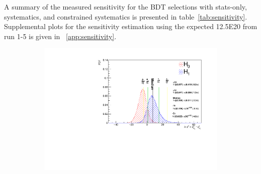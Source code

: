 A summary of the measured sensitivity for the BDT selections with stats-only, systematics, and constrained systematics is presented in table~\ref{tab:sensitivity}. Supplemental plots for the sensitivity estimation using the expected 12.5E20 from run 1-5 is given in ~\cref{app:sensitivity}.



\begin{figure}[H]
    \begin{center}

    \begin{subfigure}{0.45\textwidth}
    \includegraphics[width=1.00\textwidth]{Sensitivity/sensitivity-run123/SBNfit_Cls_nue_1e0p_numu_reco_e_H1_mc_collab_syst_detsysCNP_Chi.pdf}

\end{subfigure}
\end{center}
\end{figure}
